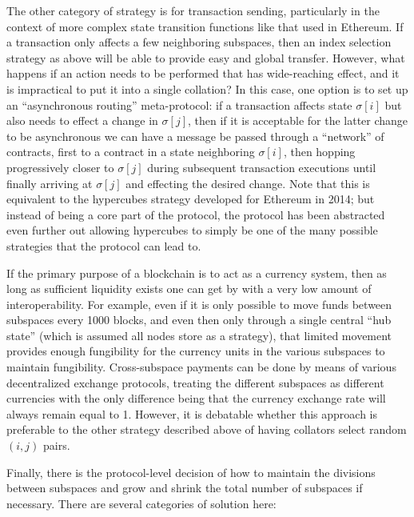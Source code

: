 \documentclass[11pt,a4paper]{article}
\theoremstyle{plain}
\theoremstyle{definition}
\theoremstyle{remark}
\begin{document}
The other category of strategy is for transaction sending, particularly in the context of more complex state transition functions like that used in Ethereum. If a transaction only affects a few neighboring subspaces, then an index selection strategy as above will be able to provide easy and global transfer. However, what happens if an action needs to be performed that has wide-reaching effect, and it is impractical to put it into a single collation? In this case, one option is to set up an ``asynchronous routing'' meta-protocol: if a transaction affects state $\sigma[i]$ but also needs to effect a change in $\sigma[j]$, then if it is acceptable for the latter change to be asynchronous we can have a message be passed through a ``network'' of contracts, first to a contract in a state neighboring $\sigma[i]$, then hopping progressively closer to $\sigma[j]$ during subsequent transaction executions until finally arriving at $\sigma[j]$ and effecting the desired change. Note that this is equivalent to the hypercubes \cite{hypercubes} strategy developed for Ethereum in 2014; but instead of being a core part of the protocol, the protocol has been abstracted even further out allowing hypercubes to simply be one of the many possible strategies that the protocol can lead to.

If the primary purpose of a blockchain is to act as a currency system, then as long as sufficient liquidity exists one can get by with a very low amount of interoperability. For example, even if it is only possible to move funds between subspaces every 1000 blocks, and even then only through a single central ``hub state'' (which is assumed all nodes store as a strategy), that limited movement provides enough fungibility for the currency units in the various subspaces to maintain fungibility. Cross-subspace payments can be done by means of various decentralized exchange protocols, treating the different subspaces as different currencies with the only difference being that the currency exchange rate will always remain equal to 1. However, it is debatable whether this approach is preferable to the other strategy described above of having collators select random $(i, j)$ pairs.

Finally, there is the protocol-level decision of how to maintain the divisions between subspaces and grow and shrink the total number of subspaces if necessary. There are several categories of solution here:
\end{document}

